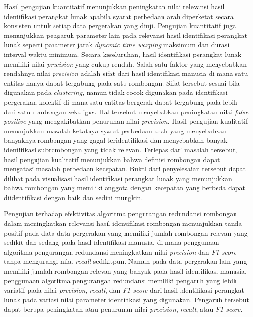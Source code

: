 Hasil pengujian kuantitatif menunjukkan peningkatan nilai relevansi hasil identifikasi perangkat lunak apabila syarat perbedaan arah diperketat secara konsisten untuk setiap data pergerakan yang diuji. Pengujian kuantitatif juga menunjukkan pengaruh parameter lain pada relevansi hasil identifikasi perangkat lunak seperti parameter jarak \textit{dynamic time warping} maksimum dan durasi interval waktu minimum. Secara keseluruhan, hasil identifikasi perangkat lunak memiliki nilai \textit{precision} yang cukup rendah. Salah satu faktor yang menyebabkan rendahnya nilai \textit{precision} adalah sifat dari hasil identifikasi manusia di mana satu entitas hanya dapat tergabung pada satu rombongan. Sifat tersebut sesuai bila digunakan pada \textit{clustering}, namun tidak cocok digunakan pada identifikasi pergerakan kolektif di mana satu entitas bergerak dapat tergabung pada lebih dari satu rombongan sekaligus. Hal tersebut menyebabkan peningkatan nilai \textit{false positive} yang mengakibatkan penurunan nilai \textit{precision}. Hasil pengujian kualitatif menunjukkan masalah ketatnya syarat perbedaan arah yang menyebabkan banyaknya rombongan yang gagal teridentifikasi dan menyebabkan banyak identifikasi subrombongan yang tidak relevan. Terlepas dari masalah tersebut, hasil pengujian kualitatif menunjukkan bahwa definisi rombongan dapat mengatasi masalah perbedaan kecepatan. Bukti dari penyelesaian tersebut dapat dilihat pada visualisasi hasil identifikasi perangkat lunak yang menunjukkan bahwa rombongan yang memiliki anggota dengan kecepatan yang berbeda dapat diidentifikasi dengan baik dan sedini mungkin.

Pengujian terhadap efektivitas algoritma pengurangan redundansi rombongan dalam meningkatkan relevansi hasil identifikasi rombongan menunjukkan tanda positif pada data-data pergerakan yang memiliki jumlah rombongan relevan yang sedikit dan sedang pada hasil identifikasi manusia, di mana penggunaan algoritma pengurangan redundansi meningkatkan nilai \textit{precision} dan \textit{F1 score} tanpa mengurangi nilai \textit{recall} sedikitpun. Namun pada data pergerakan lain yang memiliki jumlah rombongan relevan yang banyak pada hasil identifikasi manusia, penggunaan algoritma pengurangan redundansi memiliki pengaruh yang lebih variatif pada nilai \textit{precision}, \textit{recall}, dan \textit{F1 score} dari hasil identifikasi perangkat lunak pada variasi nilai parameter identifikasi yang digunakan. Pengaruh tersebut dapat berupa peningkatan atau penurunan nilai \textit{precision}, \textit{recall}, atau \textit{F1 score}.

